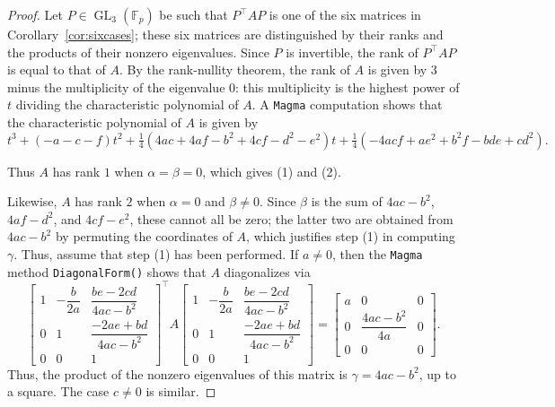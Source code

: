 \documentclass[10pt,a4paper]{amsart}
\numberwithin{equation}{section}
\numberwithin{figure}{section}
\theoremstyle{definition}
\theoremstyle{remark}
\theoremstyle{plain}
\theoremstyle{plain}
\theoremstyle{definition}
\theoremstyle{plain}
\theoremstyle{plain}
\newcommand{\F}{\mathbb{F}}
\newcommand{\GL}{\operatorname{GL}}
\begin{document}
	\begin{proof}
	Let $P\in\GL_3(\F_p)$ be such that $P^\top AP$ is one of the six matrices in Corollary~\ref{cor:sixcases}; these six matrices are distinguished by their ranks and the products of their nonzero eigenvalues. Since $P$ is invertible, the rank of $P^\top AP$ is equal to that of $A$. By the rank-nullity theorem, the rank of $A$ is given by 3 minus the multiplicity of the eigenvalue $0$: this multiplicity is the highest power of $t$ dividing the characteristic polynomial of $A$. A \texttt{Magma} \cite{magma} computation shows that the characteristic polynomial of $A$ is given by
	\begin{equation*}
	t^3+(-a-c-f)t^2+\tfrac{1}{4}(4ac+4af-b^2+4cf-d^2-e^2)t+\tfrac{1}{4}(-4acf+ae^2+b^2f-bde+cd^2).
	\end{equation*}
	
	Thus $A$ has rank $1$ when $\alpha=\beta=0$, which gives (1) and (2).
	
	Likewise, $A$ has rank $2$ when $\alpha=0$ and $\beta\ne 0$. Since $\beta$ is the sum of $4ac-b^2$, $4af-d^2$, and $4cf-e^2$, these cannot all be zero; the latter two are obtained from $4ac-b^2$ by permuting the coordinates of $A$, which justifies step (1) in computing $\gamma$. Thus, assume that step (1) has been performed. If $a\ne 0$, then the \texttt{Magma} method \texttt{DiagonalForm()} shows that $A$ diagonalizes via
	\begin{equation*}
		\begin{bmatrix}
			1 & -\dfrac{b}{2a} & \dfrac{be - 2cd}{4ac - b^2}\\
			0 & 1 & \dfrac{-2ae + bd}{4ac - b^2} \\
			0 & 0 & 1
		\end{bmatrix}^\top
		A
		\begin{bmatrix}
			1 & -\dfrac{b}{2a} & \dfrac{be - 2cd}{4ac - b^2}\\
			0 & 1 & \dfrac{-2ae + bd}{4ac - b^2} \\
			0 & 0 & 1
		\end{bmatrix}
		=
		\begin{bmatrix}
		a&0&0\\
		0&\dfrac{4ac-b^2}{4a}&0\\
		0&0&0
		\end{bmatrix}.
	\end{equation*}
	Thus, the product of the nonzero eigenvalues of this matrix is $\gamma=4ac-b^2$, up to a square. The case $c\ne 0$ is similar.
	

\end{proof}
\end{document}
